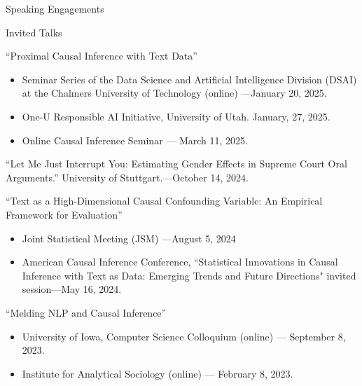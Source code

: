\documentclass{resume} %
\begin{document}
\begin{rSection}{Speaking Engagements}

\begin{rSubsection}{Invited Talks}{}{}{}
\item ``Proximal Causal Inference with Text Data''

\begin{adjustwidth}{2em}{0pt}
\begin{itemize}
    \item Seminar Series of the Data Science and Artificial Intelligence Division (DSAI) at the Chalmers University of Technology (online) ---January 20, 2025. 
    \item One-U Responsible AI Initiative, University of Utah. January, 27, 2025. 
    \item Online Causal Inference Seminar --- March 11, 2025.  
\end{itemize}
\end{adjustwidth}

\item ``Let Me Just Interrupt You:
Estimating Gender Effects in Supreme
Court Oral Arguments.'' University of Stuttgart.---October 14, 2024.

\item ``Text as a High-Dimensional Causal Confounding Variable: An Empirical Framework for Evaluation''

\begin{adjustwidth}{2em}{0pt}
\begin{itemize}
    \item  Joint Statistical Meeting (JSM) ---August 5, 2024
    \item American Causal Inference Conference, ``Statistical Innovations in Causal Inference with Text as Data: Emerging Trends and Future Directions" invited session---May 16, 2024.
\end{itemize}
\end{adjustwidth}

\item ``Melding NLP and Causal Inference''

\begin{adjustwidth}{2em}{0pt}
\begin{itemize}
    \item  University of Iowa, Computer Science Colloquium (online) --- September 8, 2023.
    \item Institute for Analytical Sociology (online) --- February 8, 2023. 
\end{itemize}
\end{adjustwidth}


\end{rSubsection}
\end{rSection}
\end{document}
